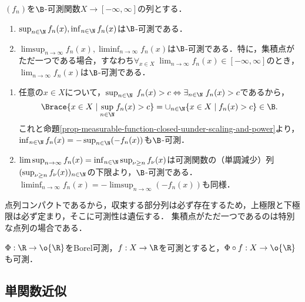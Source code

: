 \documentclass[uplatex, dvipdfmx]{jsreport}
\begin{document}
\begin{proposition}[極限構成]\label{prop-limit-of-sequence-of-measurable-function}
    $(f_n)$を$\B$-可測関数$X\to[-\infty,\infty]$の列とする．
    \begin{enumerate}
        \item $\sup_{n\in\N}f_n(x),\inf_{n\in\N}f_n(x)$は$\B$-可測である．
        \item $\limsup_{n\to\infty}f_n(x),\liminf_{n\to\infty}f_n(x)$は$\B$-可測である．特に，集積点がただ一つである場合，すなわち$\forall_{x\in X}\;\lim_{n\to\infty}f_n(x)\in[-\infty,\infty]$のとき，$\lim_{n\to\infty}f_n(x)$は$\B$-可測である．
    \end{enumerate}
\end{proposition}
\begin{Proof}\mbox{}
    \begin{enumerate}
        \item 任意の$x\in X$について，$\sup_{n\in\N}\;f_n(x)>c\Leftrightarrow\exists_{n\in\N}\;f_n(x)>c$であるから，
        \[\Brace{x\in X\mid\sup_{n\in\N}f_n(x)>c}=\cup_{n\in\N}\{x\in X\mid f_n(x)>c\}\in\B.\]
        これと命題\ref{prop-measurable-function-closed-uunder-scaling-and-power}より，$\inf_{n\in\N}f_n(x)=-\sup_{n\in\N}(-f_n(x))$も$\B$-可測．
        \item 
        $\limsup_{n\to\infty}f_n(x)=\inf_{n\in\N}\sup_{\nu\ge n}f_\nu(x)$は可測関数の（単調減少）列$(\sup_{\nu\ge n}f_\nu(x))_{n\in\N}$の下限より，$\B$-可測である．
        $\liminf_{n\to\infty}f_n(x)=-\limsup_{n\to\infty}(-f_n(x))$も同様．
    \end{enumerate}
\end{Proof}
\begin{remarks}
    点列コンパクトであるから，収束する部分列は必ず存在するため，上極限と下極限は必ず定まり，そこに可測性は遺伝する．
    集積点がただ一つであるのは特別な点列の場合である．
\end{remarks}

\begin{proposition}[Borel可測関数との合成]\label{prop-pushout-by-Borel-measurable-function-is-measurable}
    $\Phi:\R\to\o{\R}$をBorel可測，$f:X\to\R$を可測とすると，$\Phi\circ f:X\to\o{\R}$も可測．
\end{proposition}

\subsection{単関数近似}
\end{document}
